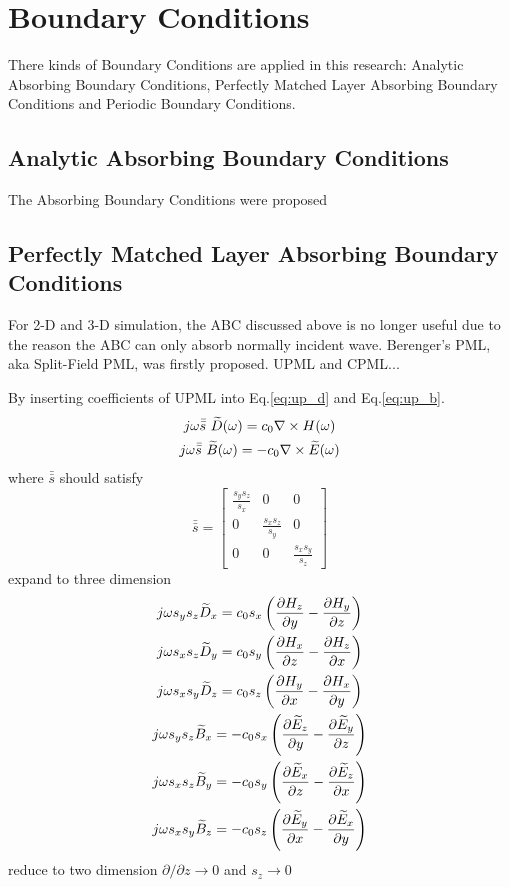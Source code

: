 \section{Boundary Conditions}
\label{sec:bcs}
There kinds of Boundary Conditions are applied in this research: Analytic Absorbing Boundary Conditions, Perfectly
Matched Layer Absorbing Boundary Conditions and Periodic Boundary Conditions.
\subsection{Analytic Absorbing Boundary Conditions}

The Absorbing Boundary Conditions were proposed

\subsection{Perfectly Matched Layer Absorbing Boundary Conditions}
\label{subsec:pml}
For 2-D and 3-D simulation, the ABC discussed above is no longer useful due to the reason the ABC can only absorb
normally incident wave. Berenger's PML, aka Split-Field PML, was firstly proposed. UPML and CPML...

By inserting coefficients of UPML into Eq.\ref{eq:up_d} and Eq.\ref{eq:up_b}.
\begin{gather}
  j\omega\bar{\bar{s}}\ \widetilde{D}(\omega) = c_0\nabla\times H(\omega)\\
  j\omega\bar{\bar{s}}\ \widetilde{B}(\omega) = -c_0\nabla\times \widetilde{E}(\omega)
\end{gather}
where $\bar{\bar{s}}$ should satisfy
\begin{equation}
  \bar{\bar{s}} = 
  \begin{bmatrix}
    \displaystyle\frac{s_ys_z}{s_x}& 0& 0\\
    0& \displaystyle\frac{s_xs_z}{s_y}& 0\\
    0& 0& \displaystyle\frac{s_xs_y}{s_z}
  \end{bmatrix}
\end{equation}
expand to three dimension
\begin{gather}
  j\omega s_y s_z \widetilde{D}_x = c_0 s_x \left( \frac{\partial H_z}{\partial y} - \frac{\partial H_y}{\partial z} \right)\\
  j\omega s_x s_z \widetilde{D}_y = c_0 s_y \left( \frac{\partial H_x}{\partial z} - \frac{\partial H_z}{\partial x} \right)\\
  j\omega s_x s_y \widetilde{D}_z = c_0 s_z \left( \frac{\partial H_y}{\partial x} - \frac{\partial H_x}{\partial y} \right)\\
  j\omega s_y s_z \widetilde{B}_x =-c_0 s_x \left(\frac{\partial \widetilde{E}_z}{\partial y} - \frac{\partial \widetilde{E}_y}{\partial z}\right)\\
  j\omega s_x s_z \widetilde{B}_y =-c_0 s_y \left(\frac{\partial \widetilde{E}_x}{\partial z} - \frac{\partial \widetilde{E}_z}{\partial x}\right)\\
  j\omega s_x s_y \widetilde{B}_z =-c_0 s_z \left(\frac{\partial \widetilde{E}_y}{\partial x} - \frac{\partial \widetilde{E}_x}{\partial y}\right)
\end{gather}
reduce to two dimension $\partial / \partial z \rightarrow 0$ and $s_z \rightarrow 0$

